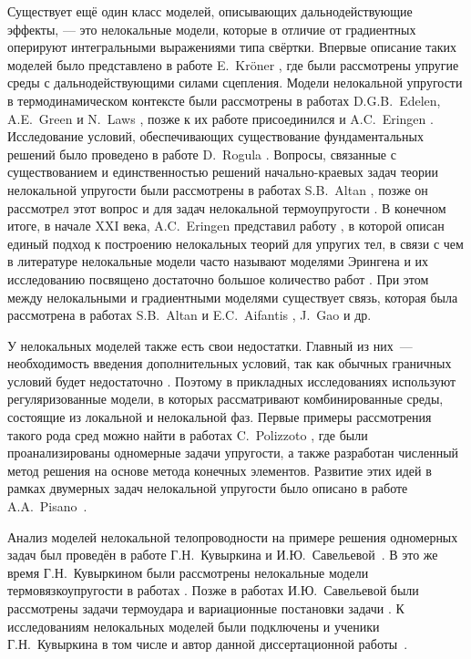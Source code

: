 \ifsynopsis
\else
Существует ещё один класс моделей, описывающих дальнодействующие эффекты, --- это нелокальные модели, которые в отличие от градиентных оперируют интегральными выражениями типа свёртки. Впервые описание таких моделей было представлено в работе E.~Kr{\"o}ner \cite{Kroner}, где были рассмотрены упругие среды с дальнодействующими силами сцепления. Модели нелокальной упругости в термодинамическом контексте были рассмотрены в работах D.G.B.~Edelen, A.E.~Green и N.~Laws \cite{Edelen1, Edelen2}, позже к их работе присоединился и A.C.~Eringen \cite{Eringen5, Eringen6}. Исследование условий, обеспечивающих существование фундаментальных решений было проведено в работе D.~Rogula \cite{Rogula1982}. Вопросы, связанные с существованием и единственностью решений начально-краевых задач теории нелокальной упругости были рассмотрены в работах S.B.~Altan \mbox{\cite{Altan1, Altan2},} позже он рассмотрел этот вопрос и для задач нелокальной термоупругости \mbox{\cite{Altan3, Altan4}.} В конечном итоге, в начале XXI века, A.C.~Eringen представил работу \cite{Eringen1}, в которой описан единый подход к построению нелокальных теорий для упругих тел, в связи с чем в литературе нелокальные модели часто называют моделями Эрингена и их исследованию посвящено достаточно большое количество работ \cite{BondaryLayer, Tuna, Rahmani}. При этом между нелокальными и градиентными моделями существует связь, которая была рассмотрена в работах S.B.~Altan и E.C.~Aifantis \cite{Aifantis3}, J.~Gao \cite{Gao} и др.
\fi

\ifsynopsis
\else
У нелокальных моделей также есть свои недостатки. Главный из них~--- необходимость введения дополнительных условий, так как обычных граничных условий будет недостаточно \cite{Pisano2}. Поэтому в прикладных исследованиях используют регуляризованные модели, в которых рассматривают комбинированные среды, состоящие из локальной и нелокальной фаз. Первые примеры рассмотрения такого рода сред можно найти в работах C.~Polizzoto \cite{Polizzotto1, Polizzotto2}, где были проанализированы одномерные задачи упругости, а также разработан численный метод решения на основе метода конечных элементов. Развитие этих идей в рамках двумерных задач нелокальной упругости было описано в работе A.A.~Pisano~\cite{Pisano1}.
\fi

\ifsynopsis
\else
Анализ моделей нелокальной телопроводности на примере решения одномерных задач был проведён в работе Г.Н.~Кувыркина и И.Ю.~Савельевой~\cite{NonlocalThermal1}. В это же время Г.Н.~Кувыркином были рассмотрены нелокальные модели термовязкоупругости в работах \cite{ThermoViscoElasticity1, ThermoViscoElasticity2, ThermoViscoElasticity3}. Позже в работах И.Ю.~Савельевой были рассмотрены задачи термоудара \cite{ThermoUdar1, ThermoUdar2} и вариационные постановки задачи \cite{NonlocalThermalVariation1, NonlocalThermalVariation2}. К исследованиям нелокальных моделей были подключены и ученики Г.Н.~Кувыркина в том числе и автор данной диссертационной работы~\mbox{\cite{AMCSM2019, ZAMM, NonlocalSaintVenant, NonlocalRadiation, KirshProblem}.}
\fi

